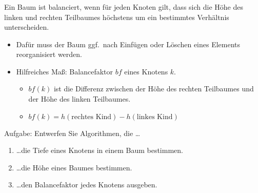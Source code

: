 \begin{frame}
\frametitle{\insertsection}
\begin{definition}
	Ein Baum ist \alert{balanciert}, wenn für jeden Knoten gilt,
	dass sich die Höhe des linken und rechten Teilbaumes höchstens um ein bestimmtes Verhältnis unterscheiden.
	\begin{itemize}
		\item<2-> Dafür muss der Baum ggf.\ nach Einfügen oder Löschen eines Elements \alert{reorganisiert} werden.
		\item<3-> Hilfreiches Maß: \alert{Balancefaktor} $bf$ eines Knotens $k$.
		\begin{itemize}
			\item $bf(k)$ ist die Differenz zwischen der Höhe des rechten Teilbaumes und der Höhe des linken Teilbaumes.
			\item $bf(k) = h(\text{rechtes Kind}) - h(\text{linkes Kind})$
		\end{itemize}
	\end{itemize}	
\end{definition}
\end{frame}

\begin{frame}
	\begin{block}
	{Aufgabe: Entwerfen Sie Algorithmen, die \ldots}
	\begin{enumerate}
		\item \ldots die Tiefe eines Knotens in einem Baum bestimmen.
		\item \ldots die Höhe eines Baumes bestimmen.
		\item \ldots den Balancefaktor jedes Knotens ausgeben.
	\end{enumerate}
	\end{block}
\end{frame}